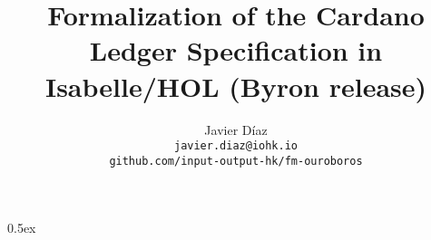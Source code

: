 \documentclass[a4paper,11pt]{article}
\begin{document}
\title{Formalization of the Cardano Ledger Specification in Isabelle/HOL (Byron release)}
\author{Javier D\'iaz\\\small\texttt{javier.diaz@iohk.io}\\\small\texttt{github.com/input-output-hk/fm-ouroboros}}

\maketitle

\tableofcontents

\parindent 0pt\parskip 0.5ex


\end{document}
